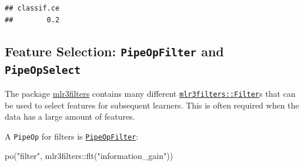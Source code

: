 \documentclass[
]{scrbook}
\newenvironment{Shaded}{\begin{snugshade}}{\end{snugshade}}
\newcommand{\DecValTok}[1]{\textcolor[rgb]{0.00,0.00,0.81}{#1}}
\newcommand{\FunctionTok}[1]{\textcolor[rgb]{0.00,0.00,0.00}{#1}}
\newcommand{\NormalTok}[1]{#1}
\newcommand{\OtherTok}[1]{\textcolor[rgb]{0.56,0.35,0.01}{#1}}
\newcommand{\SpecialCharTok}[1]{\textcolor[rgb]{0.00,0.00,0.00}{#1}}
\newcommand{\StringTok}[1]{\textcolor[rgb]{0.31,0.60,0.02}{#1}}
\renewenvironment{Shaded} {\begin{snugshade}\small} {\end{snugshade}}
\begin{document}
\begin{Shaded}
\end{Shaded}

\begin{verbatim}
## classif.ce 
##        0.2
\end{verbatim}

\hypertarget{feature-selection-pipeopfilter-and-pipeopselect}{%
\subsection{\texorpdfstring{Feature Selection: \texttt{PipeOpFilter} and \texttt{PipeOpSelect}}{Feature Selection: PipeOpFilter and PipeOpSelect}}\label{feature-selection-pipeopfilter-and-pipeopselect}}

The package \href{https://mlr3filters.mlr-org.com}{mlr3filters} contains many different \href{https://mlr3filters.mlr-org.com/reference/Filter.html}{\texttt{mlr3filters::Filter}}s that can be used to select features for subsequent learners.
This is often required when the data has a large amount of features.

A \texttt{PipeOp} for filters is \href{https://mlr3pipelines.mlr-org.com/reference/mlr_pipeops_filter.html}{\texttt{PipeOpFilter}}:

\begin{Shaded}
\begin{Highlighting}[]
\FunctionTok{po}\NormalTok{(}\StringTok{"filter"}\NormalTok{, mlr3filters}\SpecialCharTok{::}\FunctionTok{flt}\NormalTok{(}\StringTok{"information\_gain"}\NormalTok{))}
\end{Highlighting}
\end{Shaded}
\end{document}
